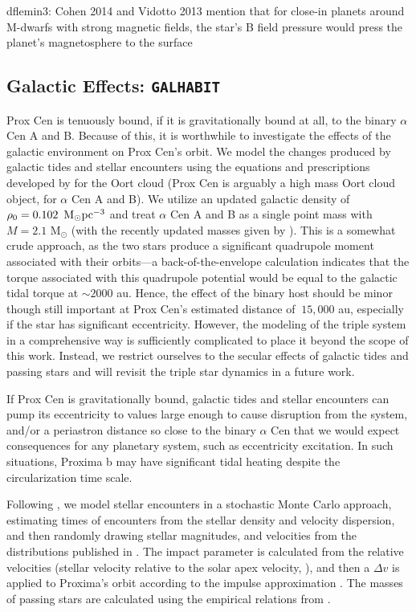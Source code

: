 \documentclass[preprint,12pt]{aastex}
\newcommand{\xxx}[1]{{\color{red} #1}} %
\def\msun{{\rm\,M_\odot}}
\def\galhabit{\texttt{\footnotesize{GALHABIT}}\xspace}
\begin{document}
\xxx{dflemin3: Cohen 2014 and Vidotto 2013 mention that for close-in planets around
M-dwarfs with strong magnetic fields, the star's B field pressure would press the planet's
magnetosphere to the surface}

\subsection{Galactic Effects: \galhabit}
\label{sec:models:galhabit}
Prox Cen is tenuously bound, if it is gravitationally bound at all, to 
the binary $\alpha$ Cen A and B. Because of this, it is worthwhile
to investigate the effects of the galactic environment on 
Prox Cen's orbit. We model the changes produced by galactic tides 
and stellar encounters using the equations and prescriptions 
developed by \cite{Heisler1986, Heisler1987, Rickman2008} 
for the Oort cloud (Prox Cen is arguably a high mass Oort cloud 
object, for $\alpha$ Cen A and B). We utilize an updated galactic 
density of $\rho_0 = 0.102~\msun \rm{pc}^{-3}$ \citep{Holmberg2000} and treat 
$\alpha$ Cen A and B as a single point mass with $M = 2.1$ 
M$_{\odot}$ (with the recently updated masses given by 
\cite{PourbaixBoffin16}). This is a somewhat crude approach, as 
the two stars produce a significant quadrupole moment associated 
with their orbits---a back-of-the-envelope calculation indicates
that the torque associated with this quadrupole potential would 
be equal to the galactic tidal torque at $\sim 2000$ au. Hence, 
the effect of the binary host should be minor though still important 
at Prox Cen's estimated distance of $~15,000$ au, especially if 
the star has significant eccentricity. However, the modeling of the 
triple system in a comprehensive way is sufficiently complicated
\citep[see, i.e.][]{Harrington1968, Ford2000} to place it beyond 
the scope of this work. Instead, we restrict ourselves to the 
secular effects of galactic tides and passing stars 
and will revisit the triple star dynamics in a future work. 

If Prox Cen is gravitationally bound, galactic tides and stellar 
encounters can pump its eccentricity to values large enough to 
cause disruption from the system, and/or a periastron distance 
so close to the binary $\alpha$ Cen that we would expect 
consequences for any planetary system, such as eccentricity 
excitation. In such situations, Proxima b may have significant tidal 
heating despite the circularization time scale. 

Following \cite{Heisler1987,Rickman2008}, we model stellar
encounters in a stochastic Monte Carlo approach, estimating times 
of encounters from the stellar density and velocity dispersion, 
and then randomly drawing stellar magnitudes, and velocities 
from the distributions published in \cite{Garciasanchez2001}. 
The impact parameter is calculated from the relative 
velocities (stellar velocity relative to the solar apex velocity, 
\cite[see][]{Rickman2008}), and then a $\Delta v$ is applied to
Proxima's orbit according to the impulse approximation
\citep{Remy1985}. The masses of passing stars are calculated 
using the empirical relations from \cite{Reid2002}.
\end{document}
